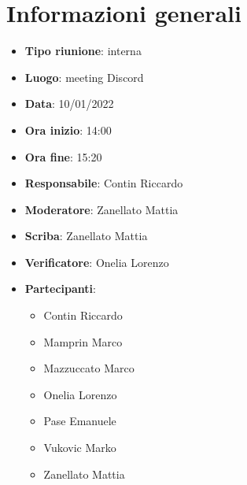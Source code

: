 \section{Informazioni generali}
\begin{itemize}
  \item \textbf{Tipo riunione}: interna
  \item \textbf{Luogo}: meeting Discord
  \item \textbf{Data}: 10/01/2022
  \item \textbf{Ora inizio}: 14:00
  \item \textbf{Ora fine}: 15:20
  \item \textbf{Responsabile}: Contin Riccardo
  \item \textbf{Moderatore}: Zanellato Mattia
  \item \textbf{Scriba}: Zanellato Mattia
  \item \textbf{Verificatore}: Onelia Lorenzo
  \item \textbf{Partecipanti}:
  \begin{itemize}
    \item Contin Riccardo
    \item Mamprin Marco
    \item Mazzuccato Marco
    \item Onelia Lorenzo
    \item Pase Emanuele
    \item Vukovic Marko
    \item Zanellato Mattia
  \end{itemize}
\end{itemize}

